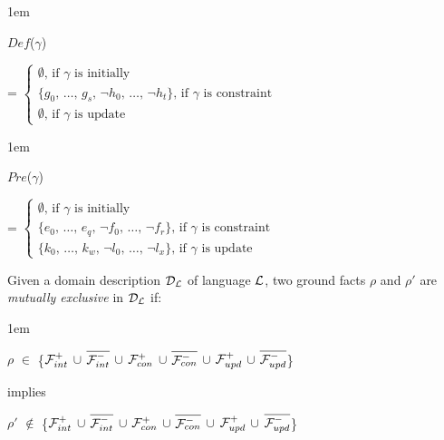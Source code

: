 \documentclass[glov2,twocolumn,final]{svjour2}
\newenvironment{vdefinition}
  {\begin{definition}\hspace{0.1em}}
  {\end{definition}}
\newenvironment{vquote}
  {\begin{list}{}{\leftmargin 1em}\item[]}
  {\end{list}}
\begin{document}
    \begin{vquote}
      $Def$($\gamma$)

      \hspace{1em}
      =
      \begin{math}
        \begin{cases}
          \mbox{$\emptyset$, if $\gamma$ is initially} \\
          \mbox{\{$g_{0}$, \ldots, $g_{s}$, $\lnot$$h_{0}$, \ldots, $\lnot$$h_{t}$\}, if $\gamma$ is constraint} \\
          \mbox{$\emptyset$, if $\gamma$ is update}
        \end{cases}
      \end{math}
    \end{vquote}

    \begin{vquote}
      $Pre$($\gamma$)

      \hspace{1em}
      =
      \begin{math}
        \begin{cases}
          \mbox{$\emptyset$, if $\gamma$ is initially} \\
          \mbox{\{$e_{0}$, \ldots, $e_{q}$, $\lnot$$f_{0}$, \ldots, $\lnot$$f_{r}$\}, if $\gamma$ is constraint} \\
          \mbox{\{$k_{0}$, \ldots, $k_{w}$, $\lnot$$l_{0}$, \ldots, $\lnot$$l_{x}$\}, if $\gamma$ is update}
        \end{cases}
      \end{math}
    \end{vquote}

    \begin{vdefinition}
      \label{def-mutex}
      Given a domain description ${\cal D_{L}}$ of language ${\cal L}$,
      two ground facts $\rho$ and $\rho'$ are {\em mutually exclusive}
      in ${\cal D_{L}}$ if:
      \begin{vquote}
        $\rho$ $\in$ \{${\cal F}^{+}_{int}$ $\cup$
        $\overline{{\cal F}^{-}_{int}}$ $\cup$ ${\cal F}^{+}_{con}$ $\cup$
        $\overline{{\cal F}^{-}_{con}}$ $\cup$ ${\cal F}^{+}_{upd}$ $\cup$
        $\overline{{\cal F}^{-}_{upd}}$\}

        implies

        $\rho'$ $\not\in$ \{${\cal F}^{+}_{int}$ $\cup$
        $\overline{{\cal F}^{-}_{int}}$ $\cup$ ${\cal F}^{+}_{con}$ $\cup$
        $\overline{{\cal F}^{-}_{con}}$ $\cup$ ${\cal F}^{+}_{upd}$ $\cup$
        $\overline{{\cal F}^{-}_{upd}}$\}
      \end{vquote}
    \end{vdefinition}
\end{document}
